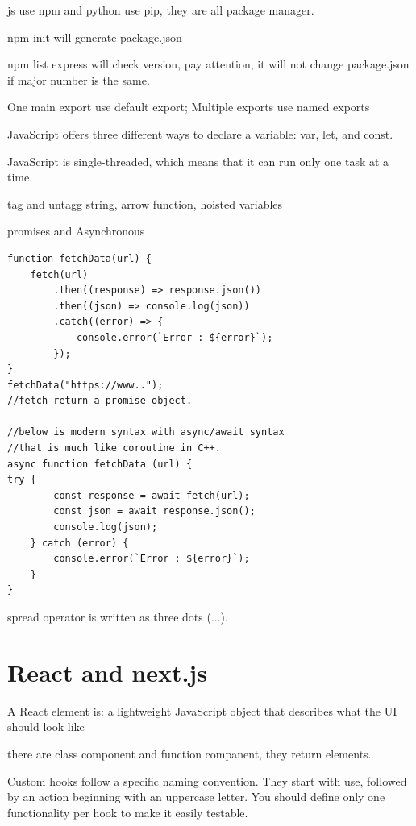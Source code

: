 \documentclass[paper=8.5in:11in, twoside, 12pt, pagesize=pdftex]{book}
\begin{document}
\par js use npm and python use pip, they are all package manager.

\par npm init will generate package.json
\par npm list express will check version, pay attention, it will not change package.json if major number is the same. 

\par One main export	use default export; Multiple exports use	named exports

\par JavaScript offers three different ways to declare a variable: var, let, and const.


\par JavaScript is single-threaded, which means that it can run only one task at a time.

\par tag and untagg string, arrow function, hoisted variables

\par promises and Asynchronous 
\begin{lstlisting}
function fetchData(url) {
	fetch(url)
		.then((response) => response.json())
		.then((json) => console.log(json))
		.catch((error) => {
			console.error(`Error : ${error}`);
		});
}
fetchData("https://www..");
//fetch return a promise object.

//below is modern syntax with async/await syntax
//that is much like coroutine in C++.
async function fetchData (url) {
try {
		const response = await fetch(url);
		const json = await response.json();
		console.log(json);
	} catch (error) {
		console.error(`Error : ${error}`);
	}
}
\end{lstlisting}

\par spread operator is written as three dots (...).

\section{React and next.js}

\par A React element is: a lightweight JavaScript object that describes what the UI should look like

\par there are class component and function companent, they return elements. 

\par Custom hooks follow
a specific naming convention. They start with use, followed by an action
beginning with an uppercase letter. You should define only one functionality
per hook to make it easily testable.
\end{document}
